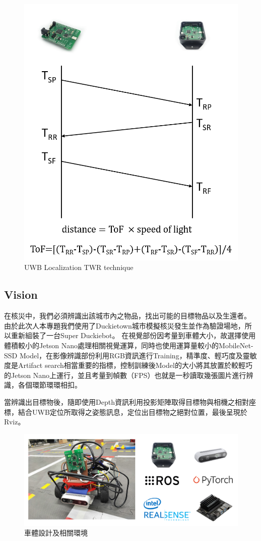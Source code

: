 \begin{figure}[t]
  \centering
    \includegraphics[width=\columnwidth]{images/uwb_tech.png}
        \caption{UWB Localization TWR technique}
 \label{figure:uwb_tech}
\end{figure}

\subsection{Vision}
在核災中，我們必須辨識出該城市內之物品，找出可能的目標物品以及生還者。
由於此次人本專題我們使用了Duckietown城市模擬核災發生並作為驗證場地，所以重新組裝了一台Super Duckiebot。
在視覺部份因考量到車體大小，故選擇使用體積較小的Jetson Nano處理相關視覺運算，同時也使用運算量較小的MobileNet-SSD Model，在影像辨識部份利用RGB資訊進行Training，精準度、輕巧度及靈敏度是Artifact search相當重要的指標，控制訓練後Model的大小將其放置於較輕巧的Jetson Nano上運行，並且考量到幀數（FPS）也就是一秒讀取幾張圖片進行辨識，各個環節環環相扣。

當辨識出目標物後，隨即使用Depth資訊利用投影矩陣取得目標物與相機之相對座標，結合UWB定位所取得之姿態訊息，定位出目標物之絕對位置，最後呈現於Rviz。

\begin{figure}[t]
  \centering
    \includegraphics[width=\columnwidth]{images/car.png}
        \caption{車體設計及相關環境}
 \label{figure:car}
\end{figure}









